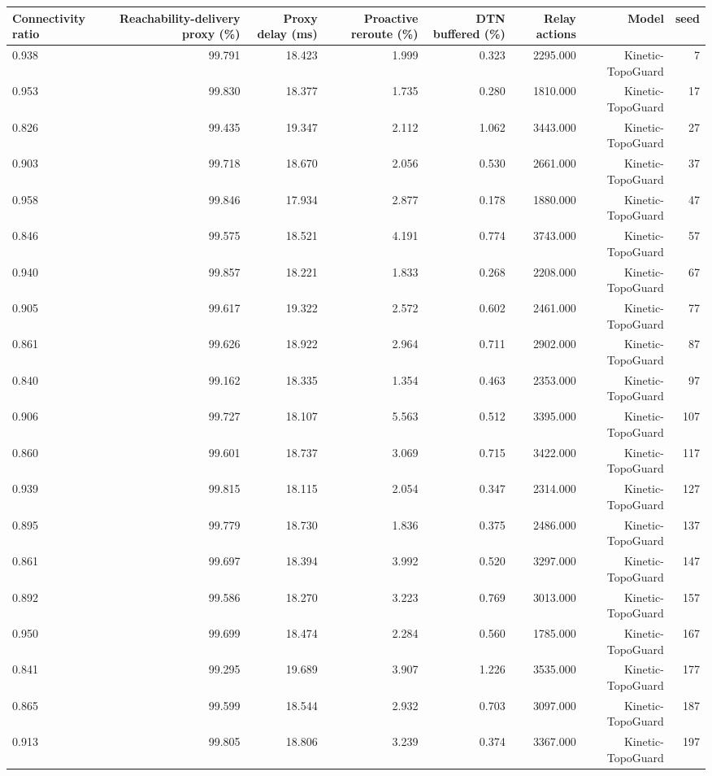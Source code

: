 \begin{tabular}{lrrrrrrr}
\toprule
Connectivity ratio & Reachability-delivery proxy (\%) & Proxy delay (ms) & Proactive reroute (\%) & DTN buffered (\%) & Relay actions & Model & seed \\
\midrule
0.938 & 99.791 & 18.423 & 1.999 & 0.323 & 2295.000 & Kinetic-TopoGuard & 7 \\
0.953 & 99.830 & 18.377 & 1.735 & 0.280 & 1810.000 & Kinetic-TopoGuard & 17 \\
0.826 & 99.435 & 19.347 & 2.112 & 1.062 & 3443.000 & Kinetic-TopoGuard & 27 \\
0.903 & 99.718 & 18.670 & 2.056 & 0.530 & 2661.000 & Kinetic-TopoGuard & 37 \\
0.958 & 99.846 & 17.934 & 2.877 & 0.178 & 1880.000 & Kinetic-TopoGuard & 47 \\
0.846 & 99.575 & 18.521 & 4.191 & 0.774 & 3743.000 & Kinetic-TopoGuard & 57 \\
0.940 & 99.857 & 18.221 & 1.833 & 0.268 & 2208.000 & Kinetic-TopoGuard & 67 \\
0.905 & 99.617 & 19.322 & 2.572 & 0.602 & 2461.000 & Kinetic-TopoGuard & 77 \\
0.861 & 99.626 & 18.922 & 2.964 & 0.711 & 2902.000 & Kinetic-TopoGuard & 87 \\
0.840 & 99.162 & 18.335 & 1.354 & 0.463 & 2353.000 & Kinetic-TopoGuard & 97 \\
0.906 & 99.727 & 18.107 & 5.563 & 0.512 & 3395.000 & Kinetic-TopoGuard & 107 \\
0.860 & 99.601 & 18.737 & 3.069 & 0.715 & 3422.000 & Kinetic-TopoGuard & 117 \\
0.939 & 99.815 & 18.115 & 2.054 & 0.347 & 2314.000 & Kinetic-TopoGuard & 127 \\
0.895 & 99.779 & 18.730 & 1.836 & 0.375 & 2486.000 & Kinetic-TopoGuard & 137 \\
0.861 & 99.697 & 18.394 & 3.992 & 0.520 & 3297.000 & Kinetic-TopoGuard & 147 \\
0.892 & 99.586 & 18.270 & 3.223 & 0.769 & 3013.000 & Kinetic-TopoGuard & 157 \\
0.950 & 99.699 & 18.474 & 2.284 & 0.560 & 1785.000 & Kinetic-TopoGuard & 167 \\
0.841 & 99.295 & 19.689 & 3.907 & 1.226 & 3535.000 & Kinetic-TopoGuard & 177 \\
0.865 & 99.599 & 18.544 & 2.932 & 0.703 & 3097.000 & Kinetic-TopoGuard & 187 \\
0.913 & 99.805 & 18.806 & 3.239 & 0.374 & 3367.000 & Kinetic-TopoGuard & 197 \\
\bottomrule
\end{tabular}